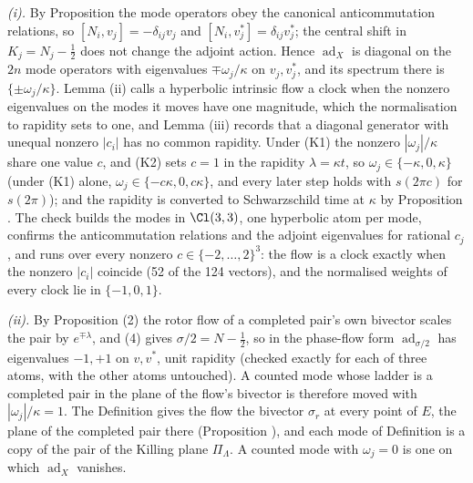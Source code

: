 \emph{(i).} By Proposition  the mode operators obey the canonical anticommutation relations, so $[N_{i}, v_{j}] = -\delta_{ij}v_{j}$ and $[N_{i}, v_{j}^{*}] = \delta_{ij}v_{j}^{*}$; the central shift in $K_{j} = N_{j} - \tfrac12$ does not change the adjoint action. Hence $\operatorname{ad}_{X}$ is diagonal on the $2n$ mode operators with eigenvalues $\mp\omega_{j}/\kappa$ on $v_{j}, v_{j}^{*}$, and its spectrum there is $\{\pm\omega_{j}/\kappa\}$. Lemma (ii) calls a hyperbolic intrinsic flow a clock when the nonzero eigenvalues on the modes it moves have one magnitude, which the normalisation to rapidity sets to one, and Lemma (iii) records that a diagonal generator with unequal nonzero $|c_{i}|$ has no common rapidity. Under (K1) the nonzero $|\omega_{j}|/\kappa$ share one value $c$, and (K2) sets $c = 1$ in the rapidity $\lambda = \kappa t$, so $\omega_{j} \in \{-\kappa, 0, \kappa\}$ (under (K1) alone, $\omega_{j} \in \{-c\kappa, 0, c\kappa\}$, and every later step holds with $s(2\pi c)$ for $s(2\pi)$); and the rapidity is converted to Schwarzschild time at $\kappa$ by Proposition . The check builds the modes in $\Cl(3,3)$, one hyperbolic atom per mode, confirms the anticommutation relations and the adjoint eigenvalues for rational $c_{j}$, and runs over every nonzero $c \in \{-2, \ldots, 2\}^{3}$: the flow is a clock exactly when the nonzero $|c_{i}|$ coincide (52 of the 124 vectors), and the normalised weights of every clock lie in $\{-1, 0, 1\}$.

\emph{(ii).} By Proposition (2) the rotor flow of a completed pair's own bivector scales the pair by $e^{\mp\lambda}$, and (4) gives $\sigma/2 = N - \tfrac12$, so in the phase-flow form $\operatorname{ad}_{\sigma/2}$ has eigenvalues $-1, +1$ on $v, v^{*}$, unit rapidity (checked exactly for each of three atoms, with the other atoms untouched). A counted mode whose ladder is a completed pair in the plane of the flow's bivector is therefore moved with $|\omega_{j}|/\kappa = 1$. The Definition  gives the flow the bivector $\sigma_{r}$ at every point of $E$, the plane of the completed pair there (Proposition ), and each mode of Definition  is a copy of the pair of the Killing plane $\Pi_{\Lambda}$. A counted mode with $\omega_{j} = 0$ is one on which $\operatorname{ad}_{X}$ vanishes.

